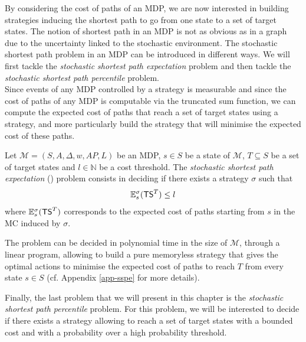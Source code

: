 By considering the cost of paths of an MDP, we are now interested in building
strategies inducing the shortest path to go from one state to a set of target
states. The notion of shortest path in an MDP is not as obvious as in a graph due to the uncertainty linked to the stochastic environment.
The stochastic shortest path problem in an MDP can be introduced in different
ways. We will first tackle the \textit{stochastic shortest path expectation} problem and
then tackle the \textit{stochastic shortest path percentile} problem. \\

Since events of any MDP controlled by a strategy is measurable and
since the cost of paths of any MDP is computable via the truncated sum function, we can
compute the expected cost of paths that reach a set of target states using a strategy, and more particularly build the strategy that will minimise the expected cost of these paths.

\begin{definition}\label{sspe}
Let $\mathcal{M}=(S, A, \Delta, w, AP, L)$ be an MDP, $s \in S$ be a state of $\mathcal{M}$,
$T \subseteq S$ be a set of target states and $l \in \mathbb{N}$ be a cost threshold. The \textit{stochastic shortest path expectation} (\SSPE{}{}) problem
consists in deciding if there exists a strategy $\sigma$ such that
\[
  \mathbb{E}^\sigma_s(\text{\sffamily TS}^T) \leq l
\]
where $\mathbb{E}_s^\sigma(\text{\sffamily TS}^T)$ corresponds to the expected cost of paths starting from $s$ in the MC induced by $\sigma$.
\end{definition}

\begin{theorem}
  The \SSPE{} problem can be decided in polynomial time in the size of $\mathcal{M}$, through a linear program, allowing to build a pure memoryless strategy that gives the optimal actions to minimise the expected cost of paths to reach $T$ from every state $s \in S$ (cf. Appendix \ref{app-sspe} for more details).
\end{theorem}

Finally, the last problem that we will present in this chapter is the
\textit{stochastic shortest path percentile} problem. For this problem, we will
be interested to decide if there exists a strategy allowing to reach a set of target states with
a bounded cost and with a probability over a high probability threshold.

